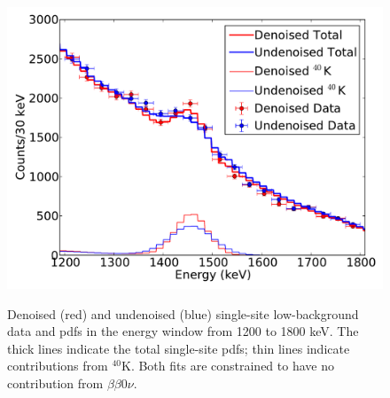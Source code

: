 \begin{figure}
\begin{center}
\includegraphics[keepaspectratio=true,width=\textwidth]{DenoisedVsUndenoised_TotalPdfsWithData_k40range.pdf}
\end{center}
\renewcommand{\baselinestretch}{1}
\small\normalsize
\begin{quote}
\caption{Denoised (red) and undenoised (blue) single-site low-background data and pdfs in the energy window from 1200 to 1800 keV.  The thick lines indicate the total single-site pdfs; thin lines indicate contributions from $^{40}$K.  Both fits are constrained to have no contribution from $\beta\beta 0\nu$.}
\label{fig:DenoisedComparison_K40SS}
\end{quote}
\end{figure}
\renewcommand{\baselinestretch}{2}
\small\normalsize

